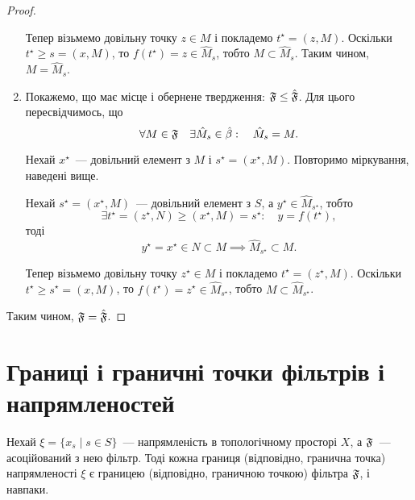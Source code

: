 \begin{proof}
\begin{enumerate}
        Тепер візьмемо довільну точку $z \in M$ і покладемо $t^\star = (z, M)$. Оскільки $t^\star \ge s = (x, M)$, то $f(t^\star) = z \in \hat M_s$, тобто $M \subset \hat M_s$. Таким чином, $M = \hat M_s$.

        \item Покажемо, що має місце і обернене твердження: $\frak F \le \hat{\frak F}$. Для цього пересвідчимось, що
        \begin{equation*}
            \forall M \in \frak F \quad
            \exists \hat M_s \in \hat \beta: \quad
            \hat M_s = M.
        \end{equation*}

        Нехай $x^\star$~--- довільний елемент з $M$ і $s^\star = (x^\star, M)$. Повторимо міркування, наведені вище. 

        Нехай $s^\star = (x^\star, M)$~--- довільний елемент з $S$, а $y^\star \in \hat M_{s^\star}$, тобто
        \begin{equation*}
            \exists t^\star = (z^\star, N) \ge (x^\star, M) = s^\star: \quad y = f(t^\star),
        \end{equation*}
        тоді
        \begin{equation*}
            y^\star = x^\star \in N \subset M \implies \hat M_{s^\star} \subset M.
        \end{equation*}

        Тепер візьмемо довільну точку $z^\star \in M$ і покладемо $t^\star = (z^\star, M)$. Оскільки $t^\star \ge s^\star = (x, M)$, то $f(t^\star) = z^\star \in \hat M_{s^\star}$, тобто $M \subset \hat M_{s^\star}$.
    \end{enumerate}
    
    Таким чином, $\frak F = \hat{\frak F}$.
\end{proof}

\section{Границі і граничні точки фільтрів і напрямленостей}

\begin{theorem}
    Нехай $\xi = \{x_s \mid s \in S\}$~--- напрямленість в топологічному просторі $X$, а $\frak F$~--- асоційований з нею фільтр. Тоді кожна границя (відповідно, гранична точка) напрямленості $\xi$ є границею (відповідно, граничною точкою) фільтра $\frak F$, і навпаки.
\end{theorem}

